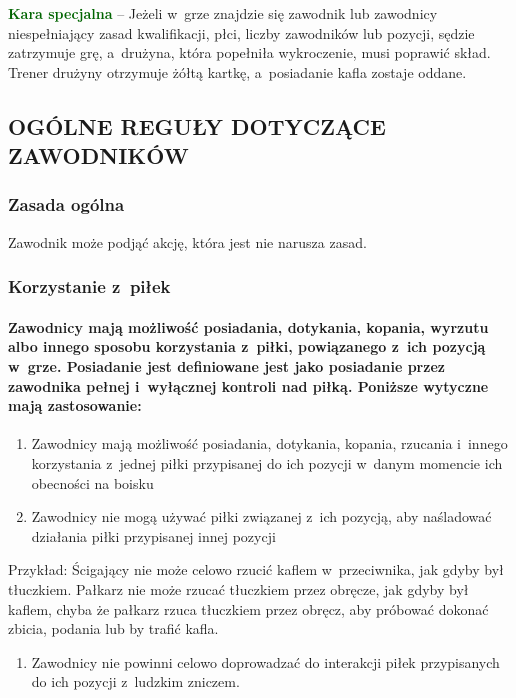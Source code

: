 \documentclass[12pt]{article}
\newcommand\other[1]{\bgroup\textcolor{darkgreen}{\textbf{#1}}}
\begin{document}
\other{Kara specjalna} -- Jeżeli w~grze znajdzie się zawodnik lub
zawodnicy niespełniający zasad kwalifikacji, płci, liczby zawodników lub
pozycji, sędzie zatrzymuje grę, a~drużyna, która popełniła wykroczenie,
musi poprawić skład. Trener drużyny otrzymuje żółtą kartkę, a~posiadanie
kafla zostaje oddane.

\subsection{OGÓLNE REGUŁY DOTYCZĄCE ZAWODNIKÓW}

\subsubsection{Zasada ogólna}

Zawodnik może podjąć akcję, która jest nie narusza zasad.

\subsubsection{Korzystanie z~piłek}

\paragraph{Zawodnicy mają możliwość posiadania, dotykania,
	kopania, wyrzutu albo innego sposobu korzystania z~piłki, powiązanego z~ich pozycją w~grze. Posiadanie jest definiowane jest jako posiadanie
	przez zawodnika pełnej i~wyłącznej kontroli nad piłką. Poniższe wytyczne
	mają zastosowanie:}

\begin{enumerate}
	\item
	      Zawodnicy mają możliwość posiadania, dotykania, kopania, rzucania i~innego korzystania z~jednej piłki przypisanej do ich pozycji w~danym
	      momencie ich obecności na boisku
	\item
	      Zawodnicy nie mogą używać piłki związanej z~ich pozycją, aby
	      naśladować działania piłki przypisanej innej pozycji
\end{enumerate}

Przykład: Ścigający nie może celowo rzucić kaflem w~przeciwnika, jak gdyby był tłuczkiem. Pałkarz nie może rzucać tłuczkiem
przez obręcze, jak gdyby był kaflem, chyba że pałkarz rzuca tłuczkiem
przez obręcz, aby próbować dokonać zbicia, podania lub by trafić kafla.

\begin{enumerate}[resume]
	\item Zawodnicy nie powinni celowo doprowadzać do interakcji piłek
	      przypisanych do ich pozycji z~ludzkim zniczem.
\end{enumerate}
\end{document}

